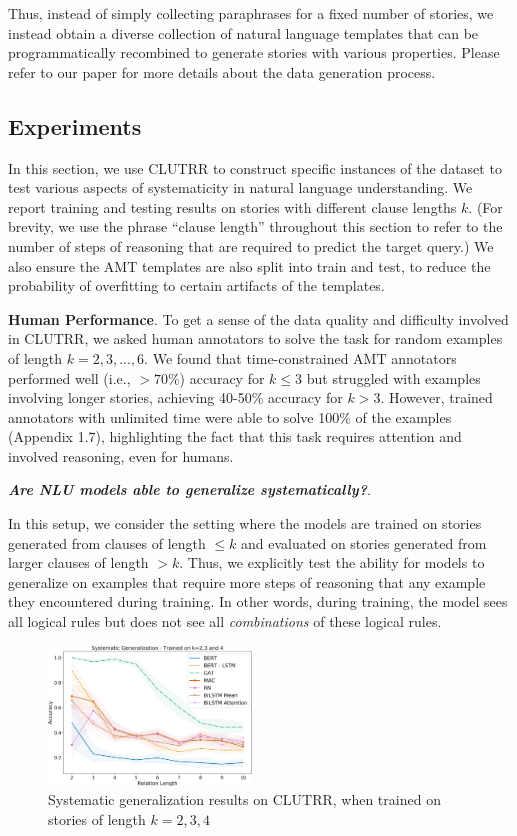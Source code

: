\documentclass[12pt]{article}
\newcommand{\xhdr}[1]{{\noindent\bfseries #1}.}
\begin{document}
Thus, instead of simply collecting paraphrases for a fixed number of stories, we instead obtain a diverse collection of natural language templates that can be programmatically recombined to generate stories with various properties. Please refer to our paper \cite{sinha2019a} for more details about the data generation process.


\subsection{Experiments}

In this section, we use CLUTRR to construct specific instances of the dataset to test various aspects of systematicity in natural language understanding.
We report training and testing results on stories with different clause lengths $k$.
(For brevity, we use the phrase ``clause length'' throughout this section to refer to the number of steps of reasoning that are required to predict the target query.)
We also ensure the AMT templates are also split into train and test, to reduce the probability of overfitting to certain artifacts of the templates.

\xhdr{Human Performance} To get a sense of the data quality and difficulty involved in CLUTRR, we asked human annotators to solve the task for random examples of length $k=2,3,...,6$.
We found that time-constrained AMT annotators performed well (i.e., ${>70\%}$) accuracy for ${k\leq 3}$ but struggled with examples involving longer stories, achieving 40-50\% accuracy for ${k > 3}$. However, trained annotators with unlimited time were able to solve 100\% of the examples (Appendix 1.7), highlighting the fact that this task requires attention and involved reasoning, even for humans.

\xhdr{\textit{Are NLU models able to generalize systematically?}}

In this setup, we consider the setting where the models are trained on stories generated from clauses of length ${\leq k}$ and evaluated on stories generated from larger clauses of length ${>k}$. Thus, we explicitly test the ability for models to generalize on examples that require more steps of reasoning that any example they encountered during training.
In other words, during training, the model sees all logical rules but does not see all {\em combinations} of these logical rules.

\begin{figure}
\begin{center}
  \includegraphics[width=0.48\textwidth]{images/clutrr_sys_gen_234.png}
\end{center}
\caption{Systematic generalization results on CLUTRR, when trained on stories of length $k=2,3,4$}
\label{fig:clutrr_sys_gen_234}
\end{figure}
\end{document}
